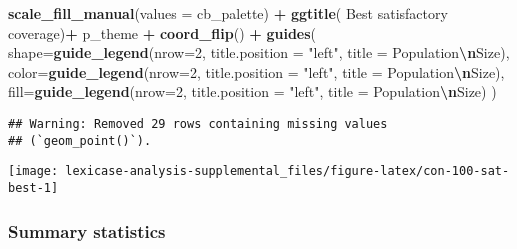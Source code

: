 \documentclass[
]{book}
\newenvironment{Shaded}{\begin{snugshade}}{\end{snugshade}}
\newcommand{\AttributeTok}[1]{\textcolor[rgb]{0.13,0.29,0.53}{#1}}
\newcommand{\DecValTok}[1]{\textcolor[rgb]{0.00,0.00,0.81}{#1}}
\newcommand{\FunctionTok}[1]{\textcolor[rgb]{0.13,0.29,0.53}{\textbf{#1}}}
\newcommand{\NormalTok}[1]{#1}
\newcommand{\SpecialCharTok}[1]{\textcolor[rgb]{0.81,0.36,0.00}{\textbf{#1}}}
\newcommand{\StringTok}[1]{\textcolor[rgb]{0.31,0.60,0.02}{#1}}
\begin{document}
\begin{Shaded}
\begin{Highlighting}[]
  \FunctionTok{scale\_fill\_manual}\NormalTok{(}\AttributeTok{values =}\NormalTok{ cb\_palette) }\SpecialCharTok{+}
  \FunctionTok{ggtitle}\NormalTok{(}\StringTok{\textquotesingle{}  Best satisfactory coverage\textquotesingle{}}\NormalTok{)}\SpecialCharTok{+}
\NormalTok{  p\_theme }\SpecialCharTok{+} \FunctionTok{coord\_flip}\NormalTok{() }\SpecialCharTok{+}
  \FunctionTok{guides}\NormalTok{(}
    \AttributeTok{shape=}\FunctionTok{guide\_legend}\NormalTok{(}\AttributeTok{nrow=}\DecValTok{2}\NormalTok{, }\AttributeTok{title.position =} \StringTok{"left"}\NormalTok{, }\AttributeTok{title =} \StringTok{\textquotesingle{}Population}\SpecialCharTok{\textbackslash{}n}\StringTok{Size\textquotesingle{}}\NormalTok{),}
    \AttributeTok{color=}\FunctionTok{guide\_legend}\NormalTok{(}\AttributeTok{nrow=}\DecValTok{2}\NormalTok{, }\AttributeTok{title.position =} \StringTok{"left"}\NormalTok{, }\AttributeTok{title =} \StringTok{\textquotesingle{}Population}\SpecialCharTok{\textbackslash{}n}\StringTok{Size\textquotesingle{}}\NormalTok{),}
    \AttributeTok{fill=}\FunctionTok{guide\_legend}\NormalTok{(}\AttributeTok{nrow=}\DecValTok{2}\NormalTok{, }\AttributeTok{title.position =} \StringTok{"left"}\NormalTok{, }\AttributeTok{title =} \StringTok{\textquotesingle{}Population}\SpecialCharTok{\textbackslash{}n}\StringTok{Size\textquotesingle{}}\NormalTok{)}
\NormalTok{  )}
\end{Highlighting}
\end{Shaded}

\begin{verbatim}
## Warning: Removed 29 rows containing missing values
## (`geom_point()`).
\end{verbatim}

\texttt{[image: lexicase-analysis-supplemental\_files/figure-latex/con-100-sat-best-1]}

\hypertarget{summary-statistics-3}{%
\subsubsection{Summary statistics}\label{summary-statistics-3}}
\end{document}
